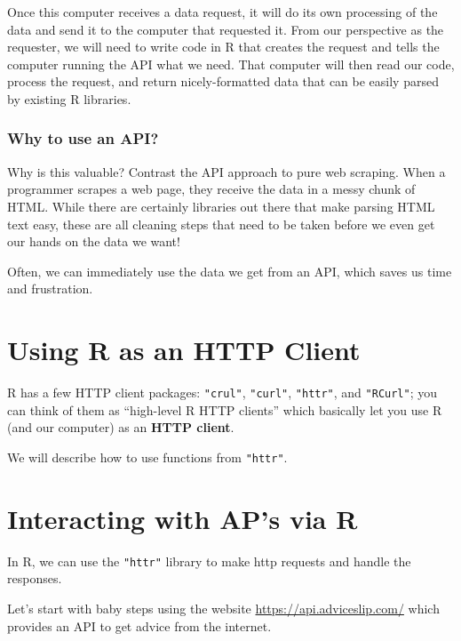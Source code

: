 \documentclass[
]{book}
\begin{document}
Once this computer receives a data request, it will do its own processing of
the data and send it to the computer that requested it. From our perspective
as the requester, we will need to write code in R that creates the request and
tells the computer running the API what we need. That computer will then read
our code, process the request, and return nicely-formatted data that can be
easily parsed by existing R libraries.

\hypertarget{why-to-use-an-api}{%
\subsubsection*{Why to use an API?}\label{why-to-use-an-api}}

Why is this valuable? Contrast the API approach to pure web scraping. When a
programmer scrapes a web page, they receive the data in a messy chunk of HTML.
While there are certainly libraries out there that make parsing HTML text easy,
these are all cleaning steps that need to be taken before we even get our hands
on the data we want!

Often, we can immediately use the data we get from an API, which saves us time
and frustration.

\hypertarget{using-r-as-an-http-client}{%
\section{Using R as an HTTP Client}\label{using-r-as-an-http-client}}

R has a few HTTP client packages: \texttt{"crul"}, \texttt{"curl"}, \texttt{"httr"}, and \texttt{"RCurl"};
you can think of them as ``high-level R HTTP clients'' which basically let you
use R (and our computer) as an \textbf{HTTP client}.

We will describe how to use functions from \texttt{"httr"}.

\hypertarget{interacting-with-aps-via-r}{%
\section{Interacting with AP's via R}\label{interacting-with-aps-via-r}}

In R, we can use the \texttt{"httr"} library to make http requests and handle the
responses.

Let's start with baby steps using the website \url{https://api.adviceslip.com/}
which provides an API to get advice from the internet.
\end{document}
